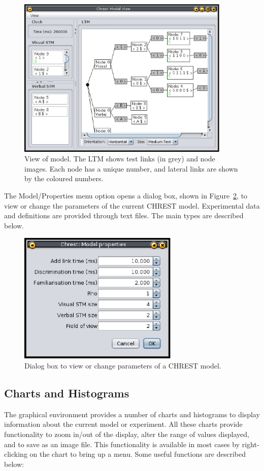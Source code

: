 \documentclass{article}
\begin{document}
\begin{figure}
\includegraphics[width=4.0in]{images/model-view.eps}
\caption{View of model.  The LTM shows test links (in grey) and node images.
Each node has a unique number, and lateral links are shown by the coloured
numbers.}
\label{model-view}
\end{figure}

The Model/Properties menu option opens a dialog box, shown in
Figure~\ref{properties}, to view or change the parameters of the current CHREST
model.  Experimental data and definitions are provided through text files.  The
main types are described below.

\begin{figure}
\includegraphics[width=3.0in]{images/properties.eps}
\caption{Dialog box to view or change parameters of a CHREST model.}
\label{properties}
\end{figure}

\subsection{Charts and Histograms}

The graphical environment provides a number of charts and histograms to display
information about the current model or experiment.  All these charts provide
functionality to zoom in/out of the display, alter the range of values
displayed, and to save as an image file.  This functionality is available in
most cases by right-clicking on the chart to bring up a menu.  Some useful
functions are described below:
\end{document}
